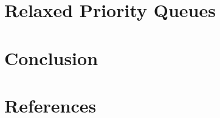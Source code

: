 \documentclass[usenames,dvipsnames]{beamer}
\begin{document}
\begin{frame}{}

\end{frame}

\section{Relaxed Priority Queues} \label{sec:relaxed}

\begin{frame}{}

\end{frame}

\section{Conclusion} \label{sec:conclusion}

\begin{frame}{}

\end{frame}

\section{References} \label{sec:references}

\begin{frame}[allowframebreaks]{}
\printbibliography
\end{frame}
\end{document}
